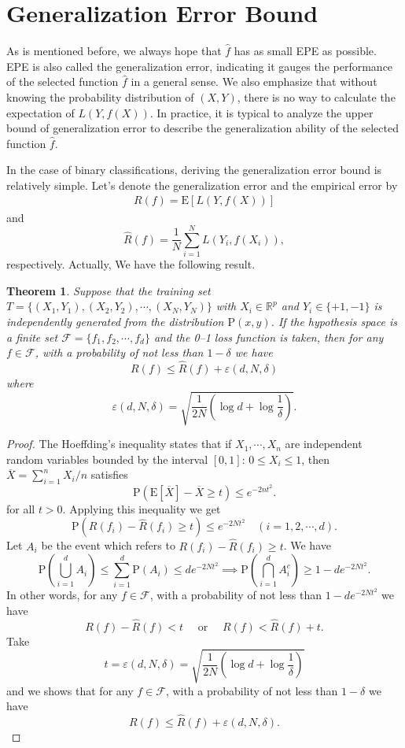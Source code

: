 \documentclass{report}
\newtheorem{theorem}{Theorem}[section]
\theoremstyle{nonumberplain}
\newtheorem{proof}{Proof.}
\newcommand{\0}{\mathbf{0}}
\begin{document}
\section{Generalization Error Bound}

As is mentioned before, we always hope that $\hat{f}$ has as small EPE as possible. EPE is also called the generalization error, indicating it gauges the performance of the selected function $\hat{f}$ in a general sense. We also emphasize that without knowing the probability distribution of $(X,Y)$, there is no way to calculate the expectation of $L(Y,f(X))$. In practice, it is typical to analyze the upper bound of generalization error to describe the generalization ability of the selected function $\hat{f}$. 

In the case of binary classifications, deriving the generalization error bound is relatively simple. Let's denote the generalization error and the empirical error by
\begin{align*}
	R(f)=\mathrm{E}[L(Y,f(X))]
\end{align*}
and
\[
\hat{R}(f)=\frac{1}{N} \sum_{i=1}^{N} L\left(Y_{i}, f\left(X_{i}\right)\right),
\]
respectively. Actually, We have the following result.

\begin{theorem}
	Suppose that the training set $T=\{(X_1,Y_1),(X_2,Y_2),\cdots,(X_{N},Y_{N})\}$ with $X_i\in\mathbb{R}^p$ and $Y_i\in\{+1,-1\}$ is  independently generated from the distribution $\mathrm{P}(x,y)$. If the hypothesis space is a finite set $\mathcal{F}=\{f_1,f_2,\cdots,f_d\}$ and the 0–1 loss function is taken, then for any $f\in \mathcal{F}$, with a probability of not less than $1-\delta$ we have
	\[
	R(f) \le \hat{R}(f)+\varepsilon(d, N, \delta)
	\]
	where 
	\[
	\varepsilon(d, N, \delta)=\sqrt{\frac{1}{2 N}\left(\log d+\log \frac{1}{\delta}\right)}.
	\]
\end{theorem}

\begin{proof} The Hoeffding's inequality states that if $X_1,\cdots, X_n$ are independent random variables bounded by the interval $[0, 1]$: $0 \le X_i \le 1$, then $\overline{X}=\sum_{i=1}^{n}X_i/n$ satisfies
\[
\mathrm{P}(\mathrm{E}[\overline{X}]-\overline{X} \geq t) \leq  e^{-2 n t^{2}}.
\]
for all $t>0$. Applying this inequality we get
\[
\mathrm{P}(R(f_i)-\hat{R}(f_i) \ge t) \leq  e^{-2 N t^{2}}\quad(i=1,2,\cdots,d).
\]
Let $A_i$ be the event which refers to $R(f_i)-\hat{R}(f_i) \ge t$. We have
\[
\mathrm{P}\left(\bigcup_{i=1}^d A_i\right)\le \sum_{i=1}^d\mathrm{P}\left( A_i\right)\le de^{-2 N t^{2}}
\implies \mathrm{P}\left(\bigcap_{i=1}^d A_i^c\right)\ge 1- de^{-2 N t^{2}}.
\]
In other words, for any $f\in \mathcal{F}$, with a probability of not less than $1- de^{-2 N t^{2}}$ we have
\[
R(f) - \hat{R}(f)<t \quad\text{ or }\quad R(f) < \hat{R}(f)+t.
\]
Take
\[
t=\varepsilon(d, N, \delta)=\sqrt{\frac{1}{2 N}\left(\log d+\log \frac{1}{\delta}\right)}
\]
and we shows that for any $f\in \mathcal{F}$, with a probability of not less than $1-\delta$ we have
\[
R(f) \le \hat{R}(f)+\varepsilon(d, N, \delta).
\]
\end{proof}
\end{document}
